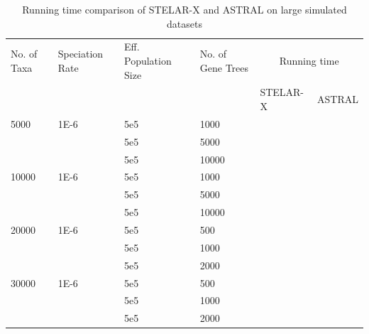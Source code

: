 \documentclass[runningheads]{llncs}
\begin{document}


\begin{table}[h]
\caption{Running time comparison of STELAR-X and ASTRAL on large simulated datasets}
\centering
\begin{tabular}{l l l l l l}
\toprule
No. of Taxa & Speciation Rate & Eff. Population Size & No. of Gene Trees & \multicolumn{2}{c}{Running time} \\
 &  &  &  & STELAR-X & ASTRAL \\
\midrule
5000  & 1E-6 & 5e5 & 1000   &    &  \\
     &      & 5e5 & 5000  &    &  \\
     &      & 5e5 & 10000 &     &  \\
10000  & 1E-6 & 5e5 & 1000   &  & \\
     &      & 5e5 & 5000  &  &  \\
     &      & 5e5 & 10000 &  &  \\
20000 & 1E-6 & 5e5 & 500   &    &  \\
     &      & 5e5 & 1000  &     &  \\
     &      & 5e5 & 2000 &    &  \\
30000 & 1E-6 & 5e5 & 500   &    &  \\
     &      & 5e5 & 1000  &     &  \\
     &      & 5e5 & 2000 &    &  \\
\bottomrule
\end{tabular}
\end{table}



 
\end{document}
